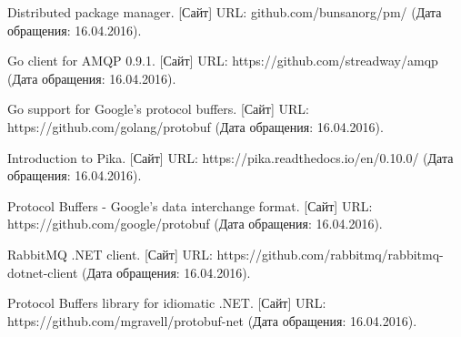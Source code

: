 \begin{thebibliography}{9}
Distributed package manager. [Сайт] URL: github.com/bunsanorg/pm/ (Дата обращения: 16.04.2016).

Go client for AMQP 0.9.1. [Сайт] URL: https://github.com/streadway/amqp (Дата обращения: 16.04.2016).

Go support for Google's protocol buffers. [Сайт] URL: https://github.com/golang/protobuf (Дата обращения: 16.04.2016).

Introduction to Pika. [Сайт] URL: https://pika.readthedocs.io/en/0.10.0/ (Дата обращения: 16.04.2016).

Protocol Buffers - Google's data interchange format. [Сайт] URL: https://github.com/google/protobuf (Дата обращения: 16.04.2016).

RabbitMQ .NET client. [Сайт] URL: https://github.com/rabbitmq/rabbitmq-dotnet-client (Дата обращения: 16.04.2016).

Protocol Buffers library for idiomatic .NET. [Сайт] URL: https://github.com/mgravell/protobuf-net (Дата обращения: 16.04.2016).

\end{thebibliography}
